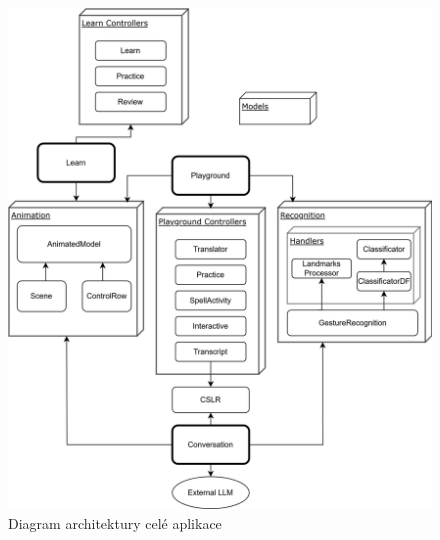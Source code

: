 \documentclass[
  master,
  program=ainfvs,
  biblatex,
  figures=true,
  tables=false,
  sourcecodes=true,
  glossaries,
  index
]{kidiplom}
\begin{document}
              \begin{figure}[htbp]
            \centering
            \includegraphics[width=1\columnwidth]{graphics/webapp-architecture-diagram.png}
            \caption{Diagram architektury celé aplikace}
            \label{webapp-architecture-diagram}
        \end{figure}
            
\end{document}
